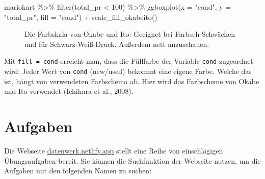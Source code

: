 \documentclass[
  letterpaper,
  oneside,
  open=any]{scrbook}
\newenvironment{Shaded}{\begin{snugshade}}{\end{snugshade}}
\newcommand{\AttributeTok}[1]{\textcolor[rgb]{0.40,0.45,0.13}{#1}}
\newcommand{\DecValTok}[1]{\textcolor[rgb]{0.68,0.00,0.00}{#1}}
\newcommand{\FunctionTok}[1]{\textcolor[rgb]{0.28,0.35,0.67}{#1}}
\newcommand{\NormalTok}[1]{\textcolor[rgb]{0.00,0.23,0.31}{#1}}
\newcommand{\SpecialCharTok}[1]{\textcolor[rgb]{0.37,0.37,0.37}{#1}}
\newcommand{\StringTok}[1]{\textcolor[rgb]{0.13,0.47,0.30}{#1}}
\theoremstyle{definition}
\theoremstyle{definition}
\theoremstyle{definition}
\theoremstyle{remark}
\begin{document}
\begin{Shaded}
\begin{Highlighting}[]
\NormalTok{mariokart }\SpecialCharTok{\%\textgreater{}\%} 
  \FunctionTok{filter}\NormalTok{(total\_pr }\SpecialCharTok{\textless{}} \DecValTok{100}\NormalTok{) }\SpecialCharTok{\%\textgreater{}\%} 
  \FunctionTok{ggboxplot}\NormalTok{(}\AttributeTok{x =} \StringTok{"cond"}\NormalTok{, }\AttributeTok{y =} \StringTok{"total\_pr"}\NormalTok{, }\AttributeTok{fill =} \StringTok{"cond"}\NormalTok{) }\SpecialCharTok{+}
  \FunctionTok{scale\_fill\_okabeito}\NormalTok{()}
\end{Highlighting}
\end{Shaded}

\begin{figure}[H]


\caption{\label{fig-okabe}Die Farbskala von Okabe und Ito: Geeignet bei
Farbseh-Schwächen und für Schwarz-Weiß-Druck. Außerdem nett
anzuschauen.}

\end{figure}%

Mit \texttt{fill\ =\ cond} erreicht man, dass die Füllfarbe der Variable
\texttt{cond} zugeordnet wird: Jeder Wert von \texttt{cond} (new/used)
bekommt eine eigene Farbe. Welche das ist, hängt von verwendeten
Farbschema ab. Hier wird das Farbscheme von Okabe und Ito verwendet
(Ichihara et al., 2008).

\section{Aufgaben}\label{aufgaben-3}

Die Webseite \href{https://datenwerk.netlify.app}{datenwerk.netlify.app}
stellt eine Reihe von einschlägigen Übungsaufgaben bereit. Sie können
die Suchfunktion der Webseite nutzen, um die Aufgaben mit den folgenden
Namen zu suchen:
\end{document}
